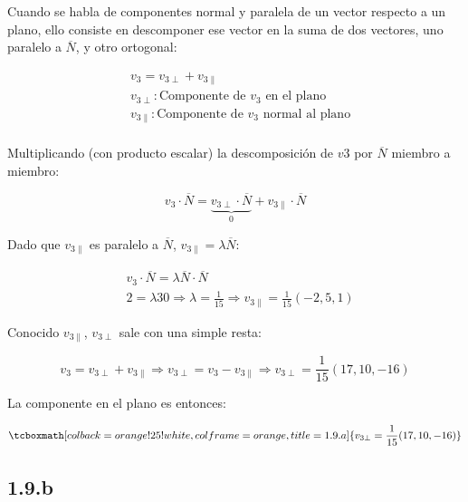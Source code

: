 \documentclass{article}
\begin{document}
Cuando se habla de componentes normal y paralela de un vector respecto a un plano, ello consiste en descomponer ese vector en la suma de dos vectores, uno paralelo a $\overline{N}$, y otro ortogonal:

\begin{subequations}
\begin{align}
& v_3 = v_{3\perp} + v_{3\parallel} \\
& v_{3\perp}: \text{Componente de } v_3 \text{ en el plano} \\
& v_{3\parallel}: \text{Componente de } v_3 \text{ normal al plano} \\
\end{align}
\end{subequations}

Multiplicando (con producto escalar) la descomposición de $v3$ por $\overline{N}$ miembro a miembro:

\begin{equation}
v_3 \cdot \overline{N} = \underbrace{ v_{3\perp} \cdot \overline{N} }_{0} + v_{3\parallel} \cdot \overline{N}
\end{equation}

Dado que $v_{3\parallel}$ es paralelo a $\overline{N}$, $v_{3\parallel} = \lambda \overline{N}$:

\begin{subequations}
\begin{align}
& v_3 \cdot \overline{N} = \lambda \overline{N} \cdot \overline{N} \\
& 2 = \lambda 30 \Rightarrow \lambda = \frac{1}{15} \Rightarrow v_{3\parallel} = \frac{1}{15} (-2, 5, 1)
\end{align}
\end{subequations}

Conocido $v_{3\parallel}$, $v_{3\perp}$ sale con una simple resta:

\begin{equation}
v_3 = v_{3\perp} + v_{3\parallel} \Rightarrow v_{3\perp} = v_3 - v_{3\parallel} \Rightarrow v_{3\perp} = \frac{1}{15} (17, 10, -16)
\end{equation}

La componente en el plano es entonces:

\begin{equation}
\tcboxmath[colback=orange!25!white,colframe=orange,title=1.9.a]
{ v_{3\perp} = \frac{1}{15} (17, 10, -16) }
\end{equation}

\subsection*{1.9.b}
\label{subsec:1.9.b}
\end{document}
